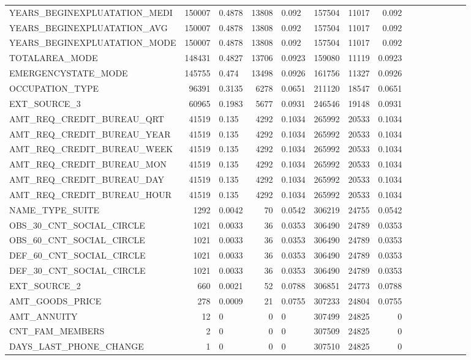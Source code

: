 \documentclass[12pt, letterpaper]{article}
\begin{document}
\begin{appendices}
{\begin{longtable}[c]{| l || Rm{1.3cm} | Rm{1.3cm} | Rm{1.3cm} | Rm{1.3cm} | Rm{1.3cm} | Rm{1.3cm} | Rm{1.3cm} |}
YEARS_BEGINEXPLUATATION_MEDI	&	150007	&	0.4878	&	13808	&	0.092	&	157504	&	11017	&	0.092	\\
YEARS_BEGINEXPLUATATION_AVG	&	150007	&	0.4878	&	13808	&	0.092	&	157504	&	11017	&	0.092	\\
YEARS_BEGINEXPLUATATION_MODE	&	150007	&	0.4878	&	13808	&	0.092	&	157504	&	11017	&	0.092	\\
TOTALAREA_MODE	&	148431	&	0.4827	&	13706	&	0.0923	&	159080	&	11119	&	0.0923	\\
EMERGENCYSTATE_MODE	&	145755	&	0.474	&	13498	&	0.0926	&	161756	&	11327	&	0.0926	\\
OCCUPATION_TYPE	&	96391	&	0.3135	&	6278	&	0.0651	&	211120	&	18547	&	0.0651	\\
EXT_SOURCE_3	&	60965	&	0.1983	&	5677	&	0.0931	&	246546	&	19148	&	0.0931	\\
AMT_REQ_CREDIT_BUREAU_QRT	&	41519	&	0.135	&	4292	&	0.1034	&	265992	&	20533	&	0.1034	\\
AMT_REQ_CREDIT_BUREAU_YEAR	&	41519	&	0.135	&	4292	&	0.1034	&	265992	&	20533	&	0.1034	\\
AMT_REQ_CREDIT_BUREAU_WEEK	&	41519	&	0.135	&	4292	&	0.1034	&	265992	&	20533	&	0.1034	\\
AMT_REQ_CREDIT_BUREAU_MON	&	41519	&	0.135	&	4292	&	0.1034	&	265992	&	20533	&	0.1034	\\
AMT_REQ_CREDIT_BUREAU_DAY	&	41519	&	0.135	&	4292	&	0.1034	&	265992	&	20533	&	0.1034	\\
AMT_REQ_CREDIT_BUREAU_HOUR	&	41519	&	0.135	&	4292	&	0.1034	&	265992	&	20533	&	0.1034	\\
NAME_TYPE_SUITE	&	1292	&	0.0042	&	70	&	0.0542	&	306219	&	24755	&	0.0542	\\
OBS_30_CNT_SOCIAL_CIRCLE	&	1021	&	0.0033	&	36	&	0.0353	&	306490	&	24789	&	0.0353	\\
OBS_60_CNT_SOCIAL_CIRCLE	&	1021	&	0.0033	&	36	&	0.0353	&	306490	&	24789	&	0.0353	\\
DEF_60_CNT_SOCIAL_CIRCLE	&	1021	&	0.0033	&	36	&	0.0353	&	306490	&	24789	&	0.0353	\\
DEF_30_CNT_SOCIAL_CIRCLE	&	1021	&	0.0033	&	36	&	0.0353	&	306490	&	24789	&	0.0353	\\
EXT_SOURCE_2	&	660	&	0.0021	&	52	&	0.0788	&	306851	&	24773	&	0.0788	\\
AMT_GOODS_PRICE	&	278	&	0.0009	&	21	&	0.0755	&	307233	&	24804	&	0.0755	\\
AMT_ANNUITY	&	12	&	0	&	0	&	0	&	307499	&	24825	&	0	\\
CNT_FAM_MEMBERS	&	2	&	0	&	0	&	0	&	307509	&	24825	&	0	\\
DAYS_LAST_PHONE_CHANGE	&	1	&	0	&	0	&	0	&	307510	&	24825	&	0	\\
\end{longtable}
}
\normalsize


\end{appendices}
\end{document}
